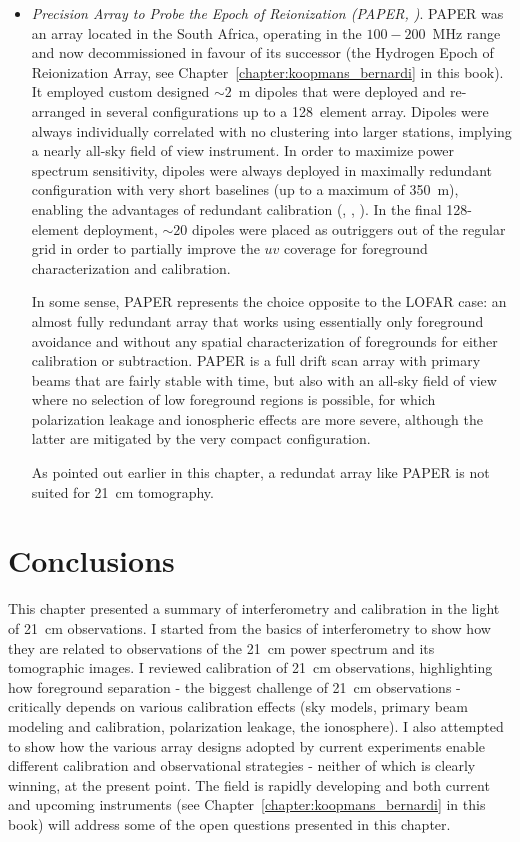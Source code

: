 {\begin{itemize}
\item {\it Precision Array to Probe the Epoch of Reionization (PAPER, \cite{parsons10})}. PAPER was an array located in the South Africa, operating in the $100-200$~MHz range and now decommissioned in favour of its successor (the Hydrogen Epoch of Reionization Array, see Chapter~\ref{chapter:koopmans_bernardi} in this book). It employed custom designed $\sim 2$~m dipoles that were deployed and re-arranged in several configurations up to a 128~element array. Dipoles were always individually correlated with no clustering into larger stations, implying a nearly all-sky field of view instrument. In order to maximize power spectrum sensitivity, dipoles were always deployed in maximally redundant configuration with very short baselines (up to a maximum of 350~m), enabling the advantages of redundant calibration (\cite{parsons14}, \cite{ali15}, \cite{jacobs15}). In the final 128-element deployment, $\sim 20$ dipoles were placed as outriggers out of the regular grid in order to partially improve the $uv$ coverage for foreground characterization and calibration. 

In some sense, PAPER represents the choice opposite to the LOFAR case: an almost fully redundant array that works using essentially only foreground avoidance and without any spatial characterization of foregrounds for either calibration or subtraction. PAPER is a full drift scan array with primary beams that are fairly stable with time, but also with an all-sky field of view where no selection of low foreground regions is possible, for which polarization leakage and ionospheric effects are more severe, although the latter are mitigated by the very compact configuration. 

As pointed out earlier in this chapter, a redundat array like PAPER is not suited for 21~cm tomography.
\end{itemize}


\section{Conclusions}
\label{sec:conclusions}

This chapter presented a summary of interferometry and calibration in the light of 21~cm observations. I started from the basics of interferometry to show how they are related to observations of the 21~cm power spectrum and its tomographic images. I reviewed calibration of 21~cm observations, highlighting how foreground separation - the biggest challenge of 21~cm observations - critically depends on various calibration effects (sky models, primary beam modeling and calibration, polarization leakage, the ionosphere). I also attempted to show how the various array designs adopted by current experiments enable different calibration and observational strategies - neither of which is clearly winning, at the present point. The field is rapidly developing and both current and upcoming instruments (see Chapter~\ref{chapter:koopmans_bernardi} in this book) will address some of the open questions presented in this chapter.



}

